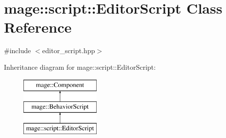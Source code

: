 \hypertarget{classmage_1_1script_1_1_editor_script}{}\section{mage\+:\+:script\+:\+:Editor\+Script Class Reference}
\label{classmage_1_1script_1_1_editor_script}


{\ttfamily \#include $<$editor\+\_\+script.\+hpp$>$}

Inheritance diagram for mage\+:\+:script\+:\+:Editor\+Script\+:\begin{figure}[H]
\begin{center}
\leavevmode
\includegraphics[height=3.000000cm]{classmage_1_1script_1_1_editor_script}
\end{center}
\end{figure}

